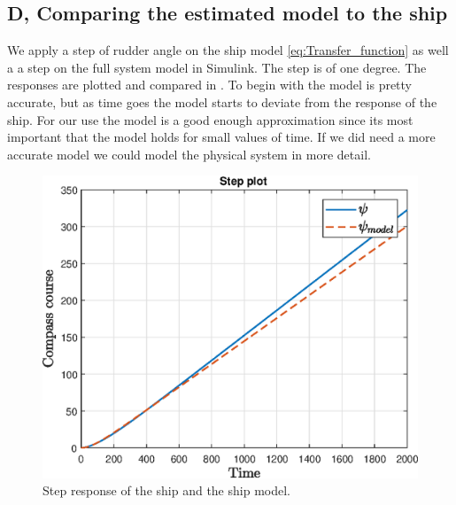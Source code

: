 \subsection{D, Comparing the estimated model to the ship}
We apply a step of rudder angle on the ship model \cref{eq:Transfer_function} as well a a step on the full system model in Simulink.  The step is of one degree. 
The responses are plotted and compared in . 
To begin with the model is pretty accurate, but as time goes the model starts to deviate from the response of the ship. For our use the model is a good enough approximation since its most important that the model holds for small values of time. If we did need a more accurate model we could model the physical system in more detail.
\begin{figure}
    \centering
    \includegraphics[width = 1.00\textwidth]{figures/plots/P5p1d_heading.eps}
    \caption{Step response of the ship and the ship model.}
    \label{fig:Step response of ship vs ship model}
\end{figure}